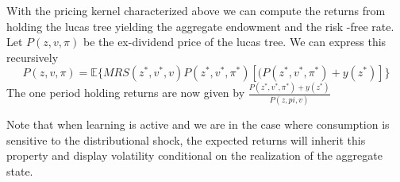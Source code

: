 \documentclass[12pt]{article}
\begin{document}
%

\noindent With the pricing kernel characterized above we can compute the returns from holding the lucas tree yielding the aggregate endowment and the risk -free rate. Let $P(z,v,\pi)$ be the ex-dividend price of the lucas tree. We can express this recursively
\begin{equation}
P(z,v,\pi) =\mathbb{E}\{MRS(z^*,v^*,v)P(z^*,v^*,\pi^*) [(P(z^*,v^*,\pi^*)+y(z^*)]\}
\label{eq:PriceOfLucasTree}
\end{equation}
\noindent The one period holding returns are now given by $\frac{P(z^*,v^*,\pi^*) +y(z^*)}{P(z,pi,v)}$

Note that when learning is active and we are in the case where consumption is sensitive to the distributional shock, the expected returns will inherit this property and display volatility conditional on the realization of the aggregate state.


%
\end{document}
